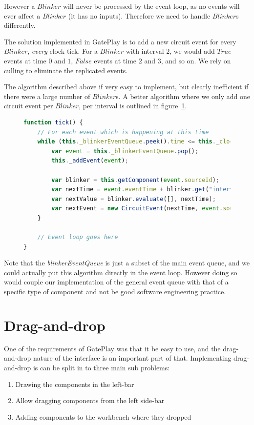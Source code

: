 However a $Blinker$ will never be processed by the event loop, as no events will ever affect a $Blinker$ (it has no inputs). Therefore we need to handle $Blinker$s differently.

The solution implemented in GatePlay is to add a new circuit event for every $Blinker$, \textit{every} clock tick. For a $Blinker$ with interval $2$, we would add $True$ events at time $0$ and $1$, $False$ events at time $2$ and $3$, and so on. We rely on culling to eliminate the replicated events.

The algorithm described above if very easy to implement, but clearly inefficient if there were a large number of $Blinker$s. A better algorithm where we only add one circuit event per $Blinker$, per interval is outlined in figure~\ref{fig:blinkerqueue}. 

\begin{figure}
\begin{lstlisting}[language=JavaScript]
function tick() {
	// For each event which is happening at this time
	while (this._blinkerEventQueue.peek().time <= this._clock) {
		var event = this._blinkerEventQueue.pop();
		this._addEvent(event);
		
		var blinker = this.getComponent(event.sourceId);
		var nextTime = event.eventTime + blinker.get("interval");
		var nextValue = blinker.evaluate([], nextTime);
		var nextEvent = new CircuitEvent(nextTime, event.sourceId, event.sourcePort, nextValue);
	}
	
	// Event loop goes here
}
\end{lstlisting}
\caption{}
\label{fig:blinkerqueue}
\end{figure}

Note that the \textit{blinkerEventQueue} is just a subset of the main event queue, and we could actually put this algorithm directly in the event loop. However doing so would couple our implementation of the general event queue with that of a specific type of component and not be good software engineering practice.

\section{Drag-and-drop}
One of the requirements of GatePlay was that it be easy to use, and the drag-and-drop nature of the interface is an important part of that. Implementing drag-and-drop is can be split in to three main sub problems:

\begin{enumerate}
	\item Drawing the components in the left-bar
	\item Allow dragging components from the left side-bar
	\item Adding components to the workbench where they dropped
\end{enumerate}

